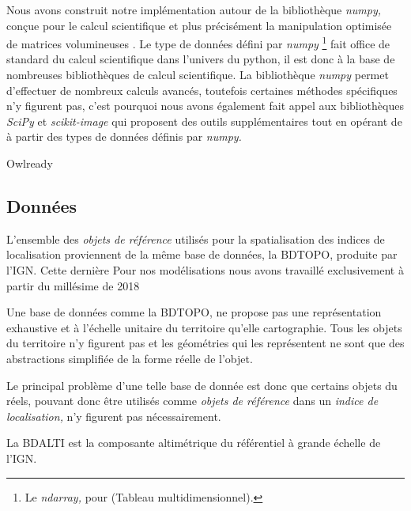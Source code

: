 Nous avons construit notre implémentation autour de la bibliothèque
\emph{numpy,} conçue pour le calcul scientifique et plus précisément
la manipulation optimisée de matrices volumineuses
\autocite{vanderWalt2011}. Le type de données défini par \emph{numpy}
\footnote{Le \emph{ndarray,} pour
   (Tableau
  multidimensionnel).} fait office de standard du calcul scientifique
dans l'univers du python, il est donc à la base de nombreuses
bibliothèques de calcul scientifique.  La bibliothèque \emph{numpy}
permet d'effectuer de nombreux calculs avancés, toutefois certaines
méthodes spécifiques n'y figurent pas, c'est pourquoi nous avons
également fait appel aux bibliothèques \emph{SciPy} et
\emph{scikit-image} \autocite{vanderWalt2014,Virtanen2020} qui
proposent des outils supplémentaires tout en opérant de à partir des
types de données définis par \emph{numpy.}

Owlready \autocite{Lamy2017}

\subsection{Données}

L'ensemble des \emph{objets de référence} utilisés pour la
spatialisation des indices de localisation proviennent de la même base
de données, la BDTOPO, produite par l'IGN. Cette dernière
%
Pour nos modélisations nous avons travaillé exclusivement à partir du
millésime de 2018


Une base de données comme la BDTOPO, ne propose pas une représentation
exhaustive et à l'échelle unitaire du territoire qu'elle
cartographie. Tous les objets du territoire n'y figurent pas et les
géométries qui les représentent ne sont que des abstractions
simplifiée de la forme réelle de l'objet.

Le principal problème d'une telle base de donnée est donc que certains
objets du réels, pouvant donc être utilisés comme \emph{objets de
  référence} dans un \emph{indice de localisation,} n'y figurent pas
nécessairement.


La BDALTI est la composante altimétrique du référentiel à grande
échelle de l'IGN.



